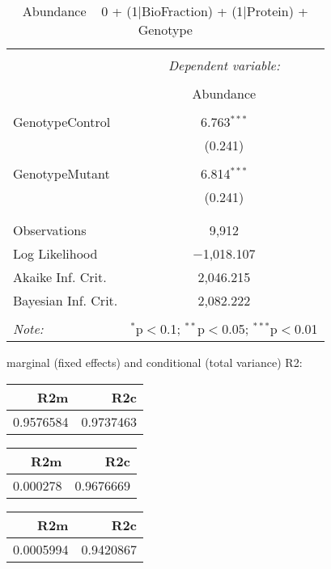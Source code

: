 \documentclass[11pt]{report}
\begin{document}
\begin{table}[!htbp] \centering 
  \caption{Abundance ~ 0 + (1|BioFraction) + (1|Protein) + Genotype} 
  \label{} 
\begin{tabular}{@{\extracolsep{5pt}}lc} 
\\[-1.8ex]\hline 
\hline \\[-1.8ex] 
 & \multicolumn{1}{c}{\textit{Dependent variable:}} \\ 
\cline{2-2} 
\\[-1.8ex] & Abundance \\ 
\hline \\[-1.8ex] 
 GenotypeControl & 6.763$^{***}$ \\ 
  & (0.241) \\ 
  & \\ 
 GenotypeMutant & 6.814$^{***}$ \\ 
  & (0.241) \\ 
  & \\ 
\hline \\[-1.8ex] 
Observations & 9,912 \\ 
Log Likelihood & $-$1,018.107 \\ 
Akaike Inf. Crit. & 2,046.215 \\ 
Bayesian Inf. Crit. & 2,082.222 \\ 
\hline 
\hline \\[-1.8ex] 
\textit{Note:}  & \multicolumn{1}{r}{$^{*}$p$<$0.1; $^{**}$p$<$0.05; $^{***}$p$<$0.01} \\ 
\end{tabular} 
\end{table} 
marginal (fixed effects) and conditional (total variance) R2:

\begin{tabular}{r|r}
\hline
R2m & R2c\\
\hline
0.9576584 & 0.9737463\\
\hline
\end{tabular}

\begin{tabular}{r|r}
\hline
R2m & R2c\\
\hline
0.000278 & 0.9676669\\
\hline
\end{tabular}

\begin{tabular}{r|r}
\hline
R2m & R2c\\
\hline
0.0005994 & 0.9420867\\
\hline
\end{tabular}
\end{document}
